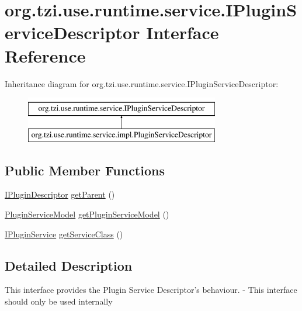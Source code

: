 \hypertarget{interfaceorg_1_1tzi_1_1use_1_1runtime_1_1service_1_1_i_plugin_service_descriptor}{\section{org.\-tzi.\-use.\-runtime.\-service.\-I\-Plugin\-Service\-Descriptor Interface Reference}
\label{interfaceorg_1_1tzi_1_1use_1_1runtime_1_1service_1_1_i_plugin_service_descriptor}
}
Inheritance diagram for org.\-tzi.\-use.\-runtime.\-service.\-I\-Plugin\-Service\-Descriptor\-:\begin{figure}[H]
\begin{center}
\leavevmode
\includegraphics[height=2.000000cm]{interfaceorg_1_1tzi_1_1use_1_1runtime_1_1service_1_1_i_plugin_service_descriptor}
\end{center}
\end{figure}
\subsection*{Public Member Functions}
\begin{DoxyCompactItemize}
\item 
\hyperlink{interfaceorg_1_1tzi_1_1use_1_1runtime_1_1_i_plugin_descriptor}{I\-Plugin\-Descriptor} \hyperlink{interfaceorg_1_1tzi_1_1use_1_1runtime_1_1service_1_1_i_plugin_service_descriptor_a1f9fcd33f578a9685c5e3dc07018984e}{get\-Parent} ()
\item 
\hyperlink{classorg_1_1tzi_1_1use_1_1runtime_1_1model_1_1_plugin_service_model}{Plugin\-Service\-Model} \hyperlink{interfaceorg_1_1tzi_1_1use_1_1runtime_1_1service_1_1_i_plugin_service_descriptor_a271ce32fdd6fa851437d7ff24a9db8f3}{get\-Plugin\-Service\-Model} ()
\item 
\hyperlink{interfaceorg_1_1tzi_1_1use_1_1runtime_1_1service_1_1_i_plugin_service}{I\-Plugin\-Service} \hyperlink{interfaceorg_1_1tzi_1_1use_1_1runtime_1_1service_1_1_i_plugin_service_descriptor_ad584331e0520e4b797ccb290ce267c74}{get\-Service\-Class} ()
\end{DoxyCompactItemize}


\subsection{Detailed Description}
This interface provides the Plugin Service Descriptor's behaviour. -\/ This interface should only be used internally

